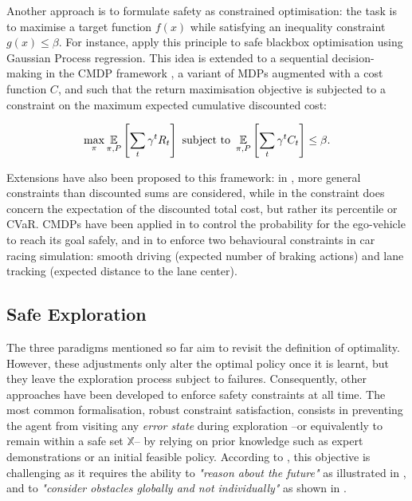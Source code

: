 Another approach is to formulate safety as constrained optimisation: the task is to maximise a target function $f(x)$ while satisfying an inequality constraint $g(x)\leq \beta$. For instance, \citet{Berkenkamp2016} apply this principle to safe blackbox optimisation using Gaussian Process regression. This idea is extended to a sequential decision-making in the \ac{CMDP} framework \citep{Altman1999,Achiam2017}, a variant of \acp*{MDP} augmented with a cost function $C$, and such that the return maximisation objective is subjected to a constraint on the maximum expected cumulative discounted cost:

\begin{equation*}
\max_\pi \operatorname*{\mathbb{E}}_{\pi, P} \left[\sum_t \gamma^t R_t \right] \text{ subject to } \operatorname*{\mathbb{E}}_{\pi, P} \left[\sum_t \gamma^t C_t \right] \leq \beta.
\end{equation*}

Extensions have also been proposed to this framework: in \citep{Tessler2019}, more general constraints than discounted sums are considered, while in \citep{Geibel2005,Chow2018} the constraint does concern the expectation of the discounted total cost, but rather its percentile or \ac{CVaR}. 
\acp*{CMDP} have been applied in \citep{Bouton2019workshop,Bouton2019} to control the probability for the ego-vehicle to reach its goal safely, and in \citep{Le2019} to enforce two behavioural constraints in car racing simulation: smooth driving (expected number of braking actions) and lane tracking (expected distance to the lane center).

\subsection{Safe Exploration}

The three paradigms mentioned so far aim to revisit the definition of optimality. However, these adjustments only alter the optimal policy once it is learnt, but they leave the exploration process subject to failures. Consequently, other approaches have been developed to enforce safety constraints at all time. The most common formalisation, robust constraint satisfaction, consists in preventing the agent from visiting any \emph{error state} during exploration --or equivalently to remain within a safe set $\mathbb{X}$-- by relying on prior knowledge such as expert demonstrations or an initial feasible policy.
According to \citet{Fraichard2014}, this objective is challenging as it requires the ability to \textit{"reason about the future"} as illustrated in , and to \textit{"consider obstacles globally and not individually"} as shown in .

